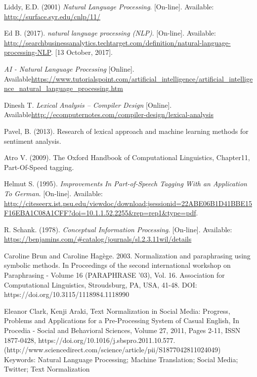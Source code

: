 \renewcommand{\bibname}{References}

\begin{thebibliography}{2}

Liddy, E.D. (2001) \textit{Natural Language Processing}. [On-line]. Available: \url{http://surface.syr.edu/cnlp/11/}

Ed B. (2017). \textit{natural language processing (NLP)}. [On-line]. Available: \url{http://searchbusinessanalytics.techtarget.com/definition/natural-language-processing-NLP}. [13 October, 2017].

\textit{AI - Natural Language Processing} [Online]. Available\url{https://www.tutorialspoint.com/artificial_intelligence/artificial_intelligence_natural_language_processing.htm}

Dinesh T. \textit{Lexical Analysis – Compiler Design} [Online]. Available\url{http://ecomputernotes.com/compiler-design/lexical-analysis}

Pavel, B. (2013). Research of lexical approach and machine learning methods for sentiment analysis.

Atro V. (2009). The Oxford Handbook of Computational Linguistics, Chapter11, Part-Of-Speed tagging. 

Helmut S. (1995). \textit{Improvements In Part-of-Speech Tagging With an Application To German}. [On-line]. Available: \url{http://citeseerx.ist.psu.edu/viewdoc/download;jsessionid=22ABE06B1D41BBE15F16EBA1C08A1CFF?doi=10.1.1.52.2255&rep=rep1&type=pdf}. 

R. Schank. (1978). \textit{Conceptual Information Processing}. [On-line]. Available: \url{https://benjamins.com/#catalog/journals/sl.2.3.11wil/details}

Caroline Brun and Caroline Hagège. 2003. Normalization and paraphrasing using symbolic methods. In Proceedings of the second international workshop on Paraphrasing - Volume 16 (PARAPHRASE '03), Vol. 16. Association for Computational Linguistics, Stroudsburg, PA, USA, 41-48. DOI: https://doi.org/10.3115/1118984.1118990

Eleanor Clark, Kenji Araki, Text Normalization in Social Media: Progress, Problems and Applications for a Pre-Processing System of Casual English, In Procedia - Social and Behavioral Sciences, Volume 27, 2011, Pages 2-11, ISSN 1877-0428, https://doi.org/10.1016/j.sbspro.2011.10.577.
(http://www.sciencedirect.com/science/article/pii/S1877042811024049)
Keywords: Natural Language Processing; Machine Translation; Social Media; Twitter; Text Normalization


\end{thebibliography}
